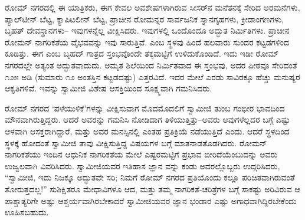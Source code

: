 ರೋಮ್ ನಗರದಲ್ಲಿ ಈ ಯಾತ್ರಿಕರು, ಈಗ ಕೇವಲ ಅವಶೇಷಗಳಾಗಿರುವ ಸೀಸರ್​ನ ಮನೆತನಕ್ಕೆ ಸೇರಿದ ಅರಮನೆಗಳು, ಪ್ಯಾಲ್​ಟೀನ್ ಬೆಟ್ಟ, ಕ್ಯಾಪಿಟಲೀನ್ ಬೆಟ್ಟ, ಪ್ರಾಚೀನ ರೋಮನ್ನರ ಸಾರ್ವಜನಿಕ ಸ್ನಾನಗೃಹಗಳು, ಕ್ರೀಡಾಂಗಣಗಳು, ಬೃಹತ್ ದೇವಸ್ಥಾನಗಳು– ಇವುಗಳನ್ನೆಲ್ಲ ವೀಕ್ಷಿಸಿದರು. ಇವುಗಳಲ್ಲಿ ಒಂದೊಂದೂ ಅದ್ಭುತ ನಿರ್ಮಿತಿಗಳು. ಪ್ರಾಚೀನ ರೋಮನ್ ನಾಗರಿಕತೆಯ ವೈಭವವನ್ನು ಇವು ಸಾರುತ್ತಿವೆ.  ಎಂಬ ಸ್ಥಳವು ಹಿಂದೆ ಹಲವಾರು ಸುಂದರ ಕಟ್ಟಡಗಳಿಂದ ಕೂಡಿತ್ತು. ಈಗ  ಎಂಬ ಬೃಹದ್ ಗಾತ್ರದ ಸ್ತಂಭವೊಂದೇ ತಕ್ಕಮಟ್ಟಿಗೆ ಉಳಿದುಕೊಂಡಿದೆ. ಇದು ಇಡೀ ರೋಮ್ ನಗರದಲ್ಲೇ ಅತ್ಯಂತ ಅದ್ಭುತವಾದುದು. ಅಮೃತ ಶಿಲೆಯಿಂದ ನಿರ್ಮಿತವಾದ ಈ ಸ್ತಂಭವು, ಅದರ ಪೀಠವೂ ಸೇರಿದಂತೆ ೧೨೫ ಅಡಿ (ಸುಮಾರು ೧೨ ಅಂತಸ್ತಿನ ಕಟ್ಟಡದಷ್ಟು) ಎತ್ತರವಿದೆ. ಇದರ ಮೇಲೆ ಎರಡು ಸಾವಿರಕ್ಕೂ ಹೆಚ್ಚು ಮನುಷ್ಯರ ಆಕೃತಿಗಳಿವೆ. ಇವನ್ನು ಸ್ವಾಮೀಜಿ ವಿಶೇಷ ಆಸಕ್ತಿಯಿಂದ ಸೂಕ್ಷ್ಮವಾಗಿ ಗಮನಿಸಿದರು.

ರೋಮ್ ನಗರದ ‘ಪಳೆಯುಳಿಕೆ’ಗಳನ್ನು ವೀಕ್ಷಿಸುವಾಗ ಮೊದಮೊದಲಿಗೆ ಸ್ವಾಮೀಜಿ ತುಂಬ ಗಂಭೀರ ಭಾವದಿಂದ ಮೌನವಾಗಿರುತ್ತಿದ್ದರು. ಆದರೆ ಅವರನ್ನು ಗಮನಿಸಿ ನೋಡಿದಾಗ ತಿಳಿಯುತ್ತಿತ್ತು–ಅವರು ಅವುಗಳೆಲ್ಲದರ ಬಗ್ಗೆ ಎಷ್ಟು ಆಳವಾಗಿ ಆಸಕ್ತರಾಗಿದ್ದಾರೆ, ಮತ್ತು ಅವರ ಮನಸ್ಸಿನಲ್ಲಿ ಎಂತಹ ಪ್ರತಿಕ್ರಿಯೆ ನಡೆಯುತ್ತಿದೆ ಎಂದು. ಆದರೆ ಸ್ಥಳದಿಂದ ಸ್ಥಳಕ್ಕೆ ಹೋದಂತೆ ಸ್ವಾಮೀಜಿ ತಾವು ವೀಕ್ಷಿಸುತ್ತಿದ್ದ ವಿಷಯಗಳ ಬಗ್ಗೆ ಮಾತನಾಡತೊಡಗಿದರು. ರೋಮನ್ ನಾಗರಿಕತೆಯು ಇಂದಿನ ಆಧುನಿಕ ನಾಗರಿಕತೆಯ ಮೇಲೆ ಎಷ್ಟರಮಟ್ಟಿಗೆ ಪ್ರಭಾವ ಬೀರಿದೆಯೆಂಬುದನ್ನು ಅವರು ಉಜ್ವಲವಾಗಿ ವಿವರಿಸಿದರು. ಸ್ವಾಮೀಜಿಯವರ ಇತಿಹಾಸ ಜ್ಞಾನ ವನ್ನು ಕಂಡು ಅವರಲ್ಲೊಬ್ಬರು ಉದ್ಗರಿಸಿದರು, “ಸ್ವಾಮೀಜಿ, ಇದು ನಿಜಕ್ಕೂ ಅದ್ಭುತವೇ ಸರಿ; ನಿಮಗೆ ರೋಮ್ ನಗರದ ಪ್ರತಿಯೊಂದು ಕಲ್ಲೂ ಪರಿಚಿತವಾಗಿರುವಂತೆ ತೋರುತ್ತದಲ್ಲ!” ಸುಶಿಕ್ಷಿತರೂ ಮೇಧಾವಿಗಳೂ ಆದ, ಮತ್ತು ತಮ್ಮ ನಾಗರಿಕತೆ-ಚರಿತ್ರೆಗಳ ಬಗ್ಗೆ ಸಾಕಷ್ಟು ಅರಿವಿರುವ ಆ ಪಾಶ್ಚಾತ್ಯರಿಗೇ ಅಷ್ಟು ಆಶ್ಚರ್ಯವಾಗಿರಬೇಕಾದರೆ ಸ್ವಾಮೀಜಿಯವರ ಜ್ಞಾನ ಭಂಡಾರ ಎಷ್ಟು ಅಗಾಧವಾಗಿದ್ದಿರಬೇಕೆಂದು ಊಹಿಸಬಹುದು.

